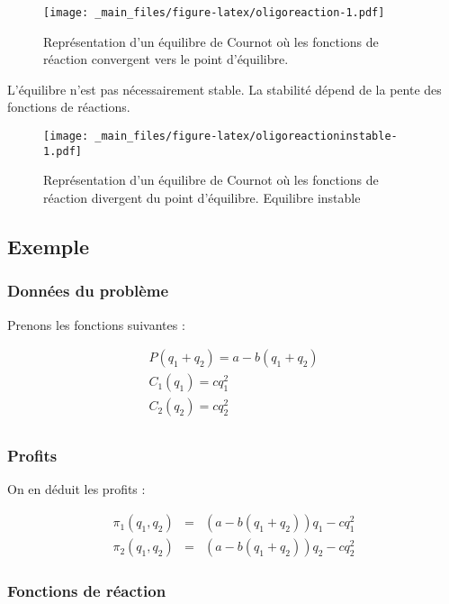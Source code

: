 \documentclass[
  a4paper,
]{book}
\theoremstyle{definition}
\theoremstyle{definition}
\theoremstyle{definition}
\theoremstyle{definition}
\theoremstyle{remark}
\begin{document}
\begin{figure}
\centering
\texttt{[image: \_main\_files/figure-latex/oligoreaction-1.pdf]}
\caption{\label{fig:oligoreaction}Représentation d'un équilibre de Cournot où les fonctions de réaction convergent vers le point d'équilibre.}
\end{figure}

L'équilibre n'est pas nécessairement stable.
La stabilité dépend de la pente des fonctions de réactions.

\begin{figure}
\centering
\texttt{[image: \_main\_files/figure-latex/oligoreactioninstable-1.pdf]}
\caption{\label{fig:oligoreactioninstable}Représentation d'un équilibre de Cournot où les fonctions de réaction divergent du point d'équilibre. Equilibre instable}
\end{figure}

\hypertarget{exemple}{%
\subsection{Exemple}\label{exemple}}

\hypertarget{donnuxe9es-du-probluxe8me}{%
\subsubsection{Données du problème}\label{donnuxe9es-du-probluxe8me}}

Prenons les fonctions suivantes :

\[
\begin{array}{l}
P(q_1+q_2) = a - b(q_1+q_2)\\
C_1(q_1) = cq^2_1 \\
C_2(q_2) = cq^2_2 \\
\end{array}
\]

\hypertarget{profits}{%
\subsubsection{Profits}\label{profits}}

On en déduit les profits :

\[
\begin{array}{rcl}
\pi_1(q_1, q_2) &=& \left(a-b(q_1+q_2)\right)q_1-cq_1^2\\
\pi_2(q_1, q_2) &=& \left(a-b(q_1+q_2)\right)q_2-cq_2^2
\end{array}
\]

\hypertarget{fonctions-de-ruxe9action}{%
\subsubsection{Fonctions de réaction}\label{fonctions-de-ruxe9action}}
\end{document}
